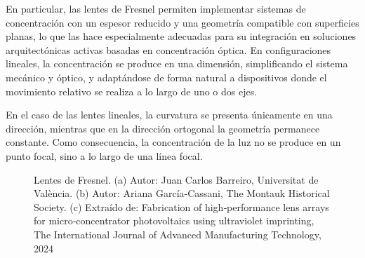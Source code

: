 En particular, las lentes de Fresnel permiten implementar sistemas de concentración con un espesor reducido y una geometría compatible con superficies planas, lo que las hace especialmente adecuadas para su integración en soluciones arquitectónicas activas basadas en concentración óptica. En configuraciones lineales, la concentración se produce en una dimensión, simplificando el sistema mecánico y óptico, y adaptándose de forma natural a dispositivos donde el movimiento relativo se realiza a lo largo de uno o dos ejes.

En el caso de las lentes lineales, la curvatura se presenta únicamente en una dirección, mientras que en la dirección ortogonal la geometría permanece constante. Como consecuencia, la concentración de la luz no se produce en un punto focal, sino a lo largo de una línea focal.


\begin{figure}[t]
	\centering
	
	
	\caption{Lentes de Fresnel. (a) Autor: Juan Carlos Barreiro, Universitat de València. (b) Autor: Ariana García-Cassani, The Montauk Historical Society. (c) Extraído de: Fabrication of high‑performance lens arrays for micro‑concentrator	photovoltaics using ultraviolet imprinting, The International Journal of Advanced Manufacturing Technology, 2024}
	\label{fig:Fresnel}
\end{figure}


